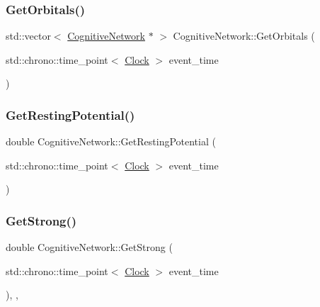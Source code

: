 \mbox{\label{classCognitiveNetwork_aa21d28ffc3b507236a7dad64663f6c42}} 
\subsubsection{\texorpdfstring{Get\+Orbitals()}{GetOrbitals()}}
{\footnotesize\ttfamily std\+::vector$<$ \mbox{\hyperlink{classCognitiveNetwork}{Cognitive\+Network}} $\ast$ $>$ Cognitive\+Network\+::\+Get\+Orbitals (\begin{DoxyParamCaption}\item[{std\+::chrono\+::time\+\_\+point$<$ \mbox{\hyperlink{universe_8h_a0ef8d951d1ca5ab3cfaf7ab4c7a6fd80}{Clock}} $>$}]{event\+\_\+time }\end{DoxyParamCaption})}

\mbox{\label{classCognitiveNetwork_a03d744f9d0d420c1e044646bc6bd2552}} 
\subsubsection{\texorpdfstring{Get\+Resting\+Potential()}{GetRestingPotential()}}
{\footnotesize\ttfamily double Cognitive\+Network\+::\+Get\+Resting\+Potential (\begin{DoxyParamCaption}\item[{std\+::chrono\+::time\+\_\+point$<$ \mbox{\hyperlink{universe_8h_a0ef8d951d1ca5ab3cfaf7ab4c7a6fd80}{Clock}} $>$}]{event\+\_\+time }\end{DoxyParamCaption})\hspace{0.3cm}{\ttfamily [inline]}}

\mbox{\label{classCognitiveNetwork_a277247686f8af159e7a7beb0ec379225}} 
\subsubsection{\texorpdfstring{Get\+Strong()}{GetStrong()}}
{\footnotesize\ttfamily double Cognitive\+Network\+::\+Get\+Strong (\begin{DoxyParamCaption}\item[{std\+::chrono\+::time\+\_\+point$<$ \mbox{\hyperlink{universe_8h_a0ef8d951d1ca5ab3cfaf7ab4c7a6fd80}{Clock}} $>$}]{event\+\_\+time }\end{DoxyParamCaption})\hspace{0.3cm}{\ttfamily [inline]}, {\ttfamily [final]}, {\ttfamily [virtual]}}



